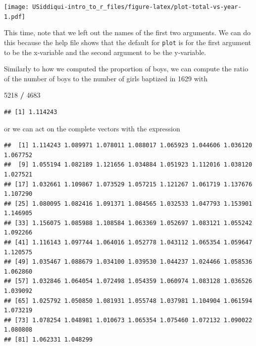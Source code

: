 \documentclass[
]{article}
\newenvironment{Shaded}{\begin{snugshade}}{\end{snugshade}}
\newcommand{\DataTypeTok}[1]{\textcolor[rgb]{0.13,0.29,0.53}{#1}}
\newcommand{\DecValTok}[1]{\textcolor[rgb]{0.00,0.00,0.81}{#1}}
\newcommand{\KeywordTok}[1]{\textcolor[rgb]{0.13,0.29,0.53}{\textbf{#1}}}
\newcommand{\NormalTok}[1]{#1}
\newcommand{\OperatorTok}[1]{\textcolor[rgb]{0.81,0.36,0.00}{\textbf{#1}}}
\newcommand{\StringTok}[1]{\textcolor[rgb]{0.31,0.60,0.02}{#1}}
\begin{document}
\begin{Shaded}
\end{Shaded}

\texttt{[image: USiddiqui-intro\_to\_r\_files/figure-latex/plot-total-vs-year-1.pdf]}

This time, note that we left out the names of the first two arguments.
We can do this because the help file shows that the default for
\texttt{plot} is for the first argument to be the x-variable and the
second argument to be the y-variable.

Similarly to how we computed the proportion of boys, we can compute the
ratio of the number of boys to the number of girls baptized in 1629 with

\begin{Shaded}
\begin{Highlighting}[]
\DecValTok{5218} \OperatorTok{/}\StringTok{ }\DecValTok{4683}
\end{Highlighting}
\end{Shaded}

\begin{verbatim}
## [1] 1.114243
\end{verbatim}

or we can act on the complete vectors with the expression

\begin{Shaded}
\end{Shaded}

\begin{verbatim}
##  [1] 1.114243 1.089971 1.078011 1.088017 1.065923 1.044606 1.036120 1.067752
##  [9] 1.055194 1.082189 1.121656 1.034884 1.051923 1.112016 1.038120 1.027521
## [17] 1.032661 1.109867 1.073529 1.057215 1.121267 1.061719 1.137676 1.107290
## [25] 1.080095 1.082416 1.091371 1.084565 1.032533 1.047793 1.153901 1.146905
## [33] 1.156075 1.085988 1.108584 1.063369 1.052697 1.083121 1.055242 1.092266
## [41] 1.116143 1.097744 1.064016 1.052778 1.043112 1.065354 1.059647 1.120575
## [49] 1.035467 1.088679 1.034100 1.039530 1.044237 1.024466 1.058536 1.062860
## [57] 1.032846 1.064054 1.072498 1.054359 1.060974 1.083128 1.036526 1.039092
## [65] 1.025792 1.050850 1.081931 1.055748 1.037981 1.104904 1.061594 1.073219
## [73] 1.078254 1.048981 1.010673 1.065354 1.075460 1.072132 1.090022 1.080808
## [81] 1.062331 1.048299
\end{verbatim}
\end{document}
